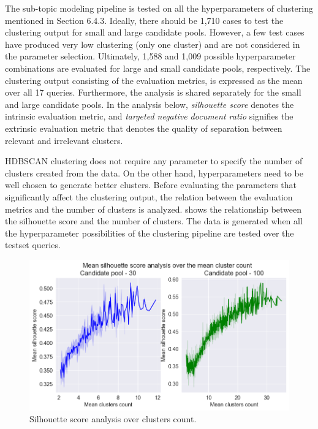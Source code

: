 The sub-topic modeling pipeline is tested on all the hyperparameters of clustering mentioned in Section 6.4.3. Ideally, there should be 1,710 cases to test the clustering output for small and large candidate pools. However, a few test cases have produced very low clustering (only one cluster) and are not considered in the parameter selection. Ultimately, 1,588 and 1,009 possible hyperparameter combinations are evaluated for large and small candidate pools, respectively. The clustering output consisting of the evaluation metrics, is expressed as the mean over all 17 queries. Furthermore, the analysis is shared separately for the small and large candidate pools. In the analysis below, \emph{silhouette score} denotes the intrinsic evaluation metric, and \emph{targeted negative document ratio} signifies the extrinsic evaluation metric that denotes the quality of separation between relevant and irrelevant clusters.

\ac{HDBSCAN} clustering does not require any parameter to specify the number of clusters created from the data. On the other hand,  hyperparameters need to be well chosen to generate better clusters. Before evaluating the parameters that significantly affect the clustering output, the relation between the evaluation metrics and the number of clusters is analyzed.   shows the relationship between the silhouette score and the number of clusters. The data is generated when all the hyperparameter possibilities of the clustering pipeline are tested over the testset queries.

\begin{figure}[h]
	\centering
	\includegraphics[width=.99\textwidth]{images/subplots/sil_score_ccnt_subplot.png}
	\caption{Silhouette score analysis over clusters count. \label{fig:silhouette_score_vs_cc}}
\end{figure}

